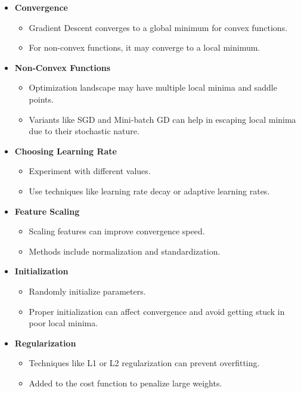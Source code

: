 \documentclass{article}
\begin{document}
\begin{itemize}
    \item \textbf{Convergence}
    \begin{itemize}
        \item Gradient Descent converges to a global minimum for convex functions.
        \item For non-convex functions, it may converge to a local minimum.
    \end{itemize}
    \item \textbf{Non-Convex Functions}
    \begin{itemize}
        \item Optimization landscape may have multiple local minima and saddle points.
        \item Variants like SGD and Mini-batch GD can help in escaping local minima due to their stochastic nature.
    \end{itemize}
    \item \textbf{Choosing Learning Rate}
    \begin{itemize}
        \item Experiment with different values.
        \item Use techniques like learning rate decay or adaptive learning rates.
    \end{itemize}
    \item \textbf{Feature Scaling}
    \begin{itemize}
        \item Scaling features can improve convergence speed.
        \item Methods include normalization and standardization.
    \end{itemize}
    \item \textbf{Initialization}
    \begin{itemize}
        \item Randomly initialize parameters.
        \item Proper initialization can affect convergence and avoid getting stuck in poor local minima.
    \end{itemize}
    \item \textbf{Regularization}
    \begin{itemize}
        \item Techniques like L1 or L2 regularization can prevent overfitting.
        \item Added to the cost function to penalize large weights.
    \end{itemize}
\end{itemize}
\end{document}
